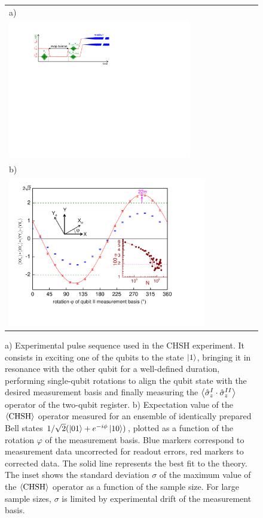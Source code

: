 \begin{figure}[ht!]
	\begin{tabular}{l}
	a) \\
		\hspace{0.7cm}\includegraphics[width=0.74\textwidth]{"./material/figures/measurement/chsh"} \\
	b) \\
		\includegraphics[width=0.8\textwidth]{./material/papers/iswap/figures/chsh}
	\end{tabular}
	\caption[]{a) Experimental pulse sequence used in the CHSH experiment. It consists in exciting one of the qubits to the state $\left| 1 \right>$, bringing it in resonance with the other qubit for a well-defined duration, performing single-qubit rotations to align the qubit state with the desired measurement basis and finally measuring the $\left< \hat{\sigma}_z^I\cdot\hat{\sigma}_z^{II} \right>$ operator of the two-qubit register. b) Expectation value of the $\left< \mathrm{CHSH} \right>$ operator measured for an ensemble of identically prepared Bell states $1/\sqrt{2}(\left| 01 \right>+e^{-i\phi}\left| 10 \right>)$, plotted as a function of the rotation $\varphi$ of the measurement basis. Blue markers correspond to measurement data uncorrected for readout errors, red markers to corrected data. The solid line represents the best fit to the theory. The inset shows the standard deviation $\sigma$ of the maximum value of the $\left< \mathrm{CHSH} \right>$ operator as a function of the sample size. For large sample sizes, $\sigma$ is limited by experimental drift of the measurement basis.}
	\label{fig:chsh}
	\label{fig:chsh_pulse_sequence}
\end{figure}

